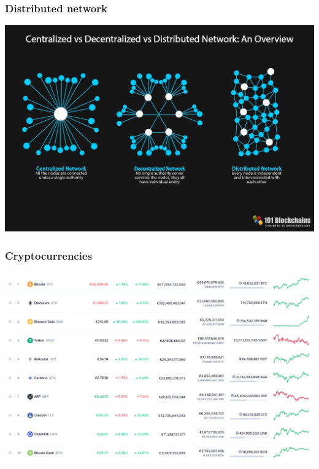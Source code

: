 \documentclass[11pt]{beamer}  %
\begin{document}
\begin{frame}\frametitle{Distributed network}

  \begin{center}
    \includegraphics[scale=0.22,clip=false]{pictures/distributed.jpg}
  \end{center}

\end{frame}

\begin{frame}\frametitle{Cryptocurrencies}

  \begin{center}
    \includegraphics[scale=0.258,clip=false]{pictures/market.png}
  \end{center}

\end{frame}
\end{document}
